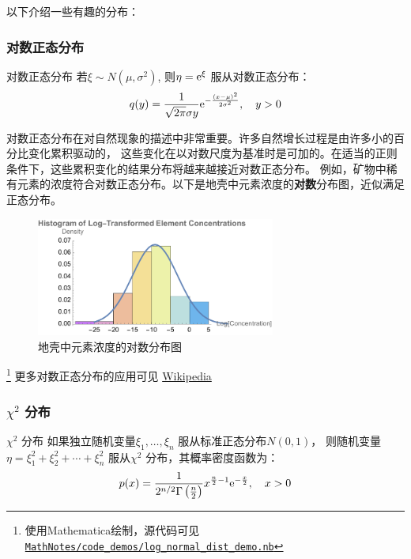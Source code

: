 以下介绍一些有趣的分布：

\subsubsection{对数正态分布}

\begin{definition}{对数正态分布}
    若\(\xi\sim N(\mu,\sigma^{2})\), 则\(\eta=\mathrm{e}^{\xi} \) 服从对数正态分布：
    \[
        q(y) = \frac{1}{\sqrt{2\pi}\sigma y}
        \mathrm{e}^{-\frac{(x-\mu)^{2}}{2\sigma^{2}}},\quad y>0
    \]
\end{definition}

对数正态分布在对自然现象的描述中非常重要。许多自然增长过程是由许多小的百分比变化累积驱动的，
这些变化在以对数尺度为基准时是可加的。在适当的正则条件下，这些累积变化的结果分布将越来越接近对数正态分布。
例如，矿物中稀有元素的浓度符合对数正态分布。以下是地壳中元素浓度的\textbf{对数}分布图，近似满足正态分布。
\begin{figure}[H]
    \centering
    \includegraphics[width=0.7\textwidth]{resources/element_concentration.pdf}
    \caption{地壳中元素浓度的对数分布图}
    \label{fig:lognormal}
\end{figure}\footnote{使用Mathematica绘制，源代码可见
\href{https://github.com/Sazzzzzz/MathNotes/main/demos/log_normal_dist_demo.nb}{\texttt{MathNotes/code_demos/log_normal_dist_demo.nb}}}
更多对数正态分布的应用可见
\href{https://en.wikipedia.org/wiki/Log-normal_distribution#Occurrence_and_applications}{Wikipedia}

\subsubsection{\(\chi^{2}\) 分布}
\begin{definition}{\(\chi^{2}\) 分布}
    如果独立随机变量\(\xi_{1}, \dots ,\xi_{n}\) 服从标准正态分布\(N(0,1)\)，
    则随机变量\(\eta = \xi_{1}^{2} + \xi_{2}^{2} + \cdots +
    \xi_{n}^{2}\) 服从\(\chi^{2}\) 分布，其概率密度函数为：
    \[
        p(x) = \frac{1}{2^{n/2} \Gamma\left( \frac{n}{2} \right)}
        x^{\frac{n}{2}-1}
        \mathrm{e}^{-\frac{x}{2}}, \quad x>0
        \]
\end{definition}

